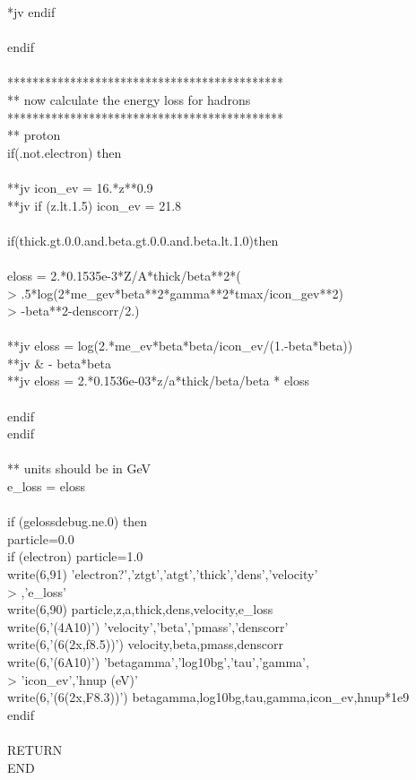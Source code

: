 {*jv         endif\\
 \\
      endif\\
 \\
********************************************\\      
** now calculate the energy loss for hadrons \\
********************************************\\
** proton\\
      if(.not.electron) then\\
 \\
**jv         icon\_ev = 16.*z**0.9\\
**jv         if (z.lt.1.5) icon\_ev = 21.8\\
 \\
         if(thick.gt.0.0.and.beta.gt.0.0.and.beta.lt.1.0)then\\
 \\
            eloss = 2.*0.1535e-3*Z/A*thick/beta**2*(\\
     >           .5*log(2*me\_gev*beta**2*gamma**2*tmax/icon\_gev**2)\\
     >           -beta**2-denscorr/2.)\\
 \\
**jv          eloss = log(2.*me\_ev*beta*beta/icon\_ev/(1.-beta*beta))\\
**jv     \&                - beta*beta\\
**jv          eloss = 2.*0.1536e-03*z/a*thick/beta/beta * eloss\\
 \\
         endif\\
      endif\\
 \\
** units should be in GeV\\
      e\_loss = eloss\\
 \\
      if (gelossdebug.ne.0) then\\
         particle=0.0\\
         if (electron) particle=1.0\\
         write(6,91) 'electron?','ztgt','atgt','thick','dens','velocity'\\
     > 		,'e\_loss'\\
         write(6,90) particle,z,a,thick,dens,velocity,e\_loss\\
         write(6,'(4A10)') 'velocity','beta','pmass','denscorr'\\
         write(6,'(6(2x,f8.5))') velocity,beta,pmass,denscorr\\
         write(6,'(6A10)') 'betagamma','log10bg','tau','gamma',\\
     >		'icon\_ev','hnup (eV)'\\
         write(6,'(6(2x,F8.3))') betagamma,log10bg,tau,gamma,icon\_ev,hnup*1e9\\
      endif\\
 \\
      RETURN\\
      END\\
 \\
 \\
}

